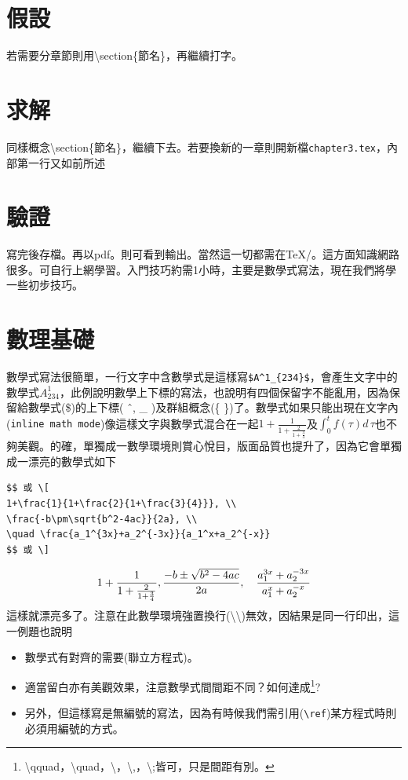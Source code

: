 \section{假設}
若需要分章節則用{\textbackslash section\{節名\}}，再繼續打字。
\section{求解}
同樣概念{\textbackslash section\{節名\}}，繼續下去。若要換新的一章則開新檔{\tt chapter3.tex}，內部第一行又如前所述

\section{驗證}
寫完後存檔。再以pdf 。則可看到輸出。當然這一切都需在\TeX/。這方面知識網路很多。可自行上網學習。入門技巧約需1小時，主要是數學式寫法，現在我們將學一些初步技巧。
\section{數理基礎}
數學式寫法很簡單，一行文字中含數學式是這樣寫\verb|$A^1_{234}$|，會產生文字中的數學式$A^1_{234}$，此例說明數學上下標的寫法，也說明有四個保留字不能亂用，因為保留給數學式(\$)的上下標( \^\ , \_ )及群組概念(\{ \})了。數學式如果只能出現在文字內({\tt inline math mode})像這樣文字與數學式混合在一起$1+\frac{1}{1+\frac{2}{1+\frac{3}{4}}}$及$\displaystyle \int_0^t f(\tau) d\,\tau$也不夠美觀。的確，單獨成一數學環境則賞心悅目，版面品質也提升了，因為它會單獨成一漂亮的數學式如下  \index{\LaTeX環境!\textbackslash [}\index{\LaTeX環境!\textbackslash ]}
\begin{Verbatim}[frame=single,firstline=1,label=Form 1 w/o number]
$$ 或 \[
1+\frac{1}{1+\frac{2}{1+\frac{3}{4}}}, \\
\frac{-b\pm\sqrt{b^2-4ac}}{2a}, \\
\quad \frac{a_1^{3x}+a_2^{-3x}}{a_1^x+a_2^{-x}}
$$ 或 \]
\end{Verbatim}

$$ 
1+\frac{1}{1+\frac{2}{1+\frac{3}{4}}}, \\
\frac{-b\pm\sqrt{b^2-4ac}}{2a},\\
\quad \frac{a_1^{3x}+a_2^{-3x}}{a_1^x+a_2^{-x}}
$$
這樣就漂亮多了。注意在此數學環境強置換行(\textbackslash \textbackslash)無效，因結果是同一行印出，這一例題也說明
\begin{itemize}
\item 數學式有對齊的需要(聯立方程式)。
\item 適當留白亦有美觀效果，注意數學式間間距不同？如何達成\footnote{\textbackslash qquad，\textbackslash quad，\textbackslash ，\textbackslash,，\textbackslash;皆可，只是間距有別。}? 
\item 另外，但這樣寫是無編號的寫法，因為有時候我們需引用(\verb|\ref|)某方程式時則必須用編號的方式。
\end{itemize}
